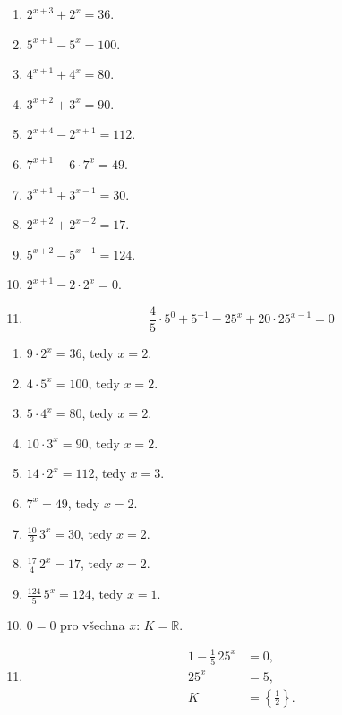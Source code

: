 \documentclass[11pt,a4paper]{article}
\begin{document}
\begin{zadaniReseniBox}[title={Samostatná práce 1}]
\begin{enumerate}[label=\alph*)]
\item $2^{x+3}+2^x=36$.
\item $5^{x+1}-5^x=100$.
\item $4^{x+1}+4^x=80$.
\item $3^{x+2}+3^x=90$.
\item $2^{x+4}-2^{x+1}=112$.
\item $7^{x+1}-6\cdot7^x=49$.
\item $3^{x+1}+3^{x-1}=30$.
\item $2^{x+2}+2^{x-2}=17$.
\item $5^{x+2}-5^{x-1}=124$.
\item $2^{x+1}-2\cdot2^x=0$.
\item \[ \displaystyle\frac{4}{5}\cdot5^0+5^{-1}-25^x+20\cdot25^{x-1}=0 \]
\end{enumerate}
\tcblower
\begin{enumerate}[label=\alph*)]
\item $9\cdot2^x=36$, tedy $x=2$.
\item $4\cdot5^x=100$, tedy $x=2$.
\item $5\cdot4^x=80$, tedy $x=2$.
\item $10\cdot3^x=90$, tedy $x=2$.
\item $14\cdot2^x=112$, tedy $x=3$.
\item $7^x=49$, tedy $x=2$.
\item $\frac{10}{3}\,3^x=30$, tedy $x=2$.
\item $\frac{17}{4}\,2^x=17$, tedy $x=2$.
\item $\frac{124}{5}\,5^x=124$, tedy $x=1$.
\item $0=0$ pro všechna $x$: $K=\mathbb R$.
\item \[\begin{aligned}1-\frac{1}{5}\,25^x&=0,\\25^x&=5,\\K&=\left\{\frac{1}{2}\right\}.\end{aligned}\]
\end{enumerate}
\end{zadaniReseniBox}
\end{document}

